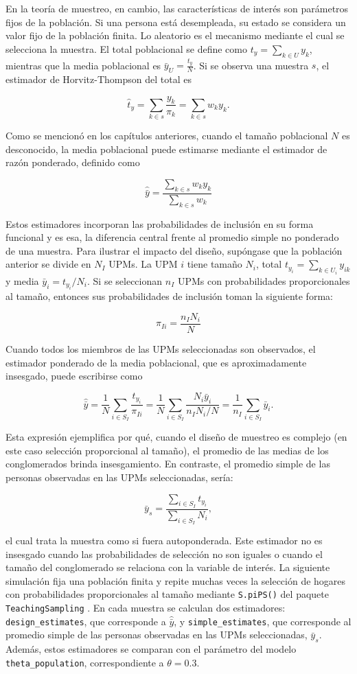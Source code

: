 \documentclass[
  spanish,
  12pt,
]{book}
\begin{document}
En la teoría de muestreo, en cambio, las características de interés son parámetros fijos de la población. Si una persona está desempleada, su estado se considera un valor fijo de la población finita. Lo aleatorio es el mecanismo mediante el cual se selecciona la muestra. El total poblacional se define como \(t_y = \sum_{k \in U} y_k\), mientras que la media poblacional es \(\bar{y}_U = \frac{t_y}{N}\). Si se observa una muestra \(s\), el estimador de Horvitz-Thompson del total es

\[
\hat{t}_{y} = \sum_{k \in s}\frac{y_k}{\pi_k}
= \sum_{k \in s}w_k y_k.
\]

Como se mencionó en los capítulos anteriores, cuando el tamaño poblacional \(N\) es desconocido, la media poblacional puede estimarse mediante el estimador de razón ponderado, definido como

\[
\hat{\bar{y}} =
\frac{\sum_{k \in s}w_k y_k}
{\sum_{k \in s}w_k}
\]

Estos estimadores incorporan las probabilidades de inclusión en su forma funcional y es esa, la diferencia central frente al promedio simple no ponderado de una muestra. Para ilustrar el impacto del diseño, supóngase que la población anterior se divide en \(N_I\) UPMs. La UPM \(i\) tiene tamaño \(N_i\), total \(t_{y_i}=\sum_{k \in U_i}y_{ik}\) y media \(\bar{y}_i=t_{y_i}/N_i\). Si se seleccionan \(n_I\) UPMs con probabilidades proporcionales al tamaño, entonces sus probabilidades de inclusión toman la siguiente forma:

\[
\pi_{Ii} = \frac{n_I N_i}{N}
\]

Cuando todos los miembros de las UPMs seleccionadas son observados, el estimador ponderado de la media poblacional, que es aproximadamente insesgado, puede escribirse como

\[
\hat{\bar{y}}
= \frac{1}{N}\sum_{i \in S_I}\frac{t_{y_i}}{\pi_{Ii}}
= \frac{1}{N}\sum_{i \in S_I}\frac{N_i\bar{y}_i}{n_I N_i/N}
= \frac{1}{n_I}\sum_{i \in S_I}\bar{y}_i.
\]

Esta expresión ejemplifica por qué, cuando el diseño de muestreo es complejo (en este caso selección proporcional al tamaño), el promedio de las medias de los conglomerados brinda insesgamiento. En contraste, el promedio simple de las personas observadas en las UPMs seleccionadas, sería:

\[
\bar{y}_s =
\frac{\sum_{i \in S_I}t_{y_i}}
     {\sum_{i \in S_I}N_i},
\]

el cual trata la muestra como si fuera autoponderada. Este estimador no es insesgado cuando las probabilidades de selección no son iguales o cuando el tamaño del conglomerado se relaciona con la variable de interés. La siguiente simulación fija una población finita y repite muchas veces la selección de hogares con probabilidades proporcionales al tamaño mediante \texttt{S.piPS()} del paquete \texttt{TeachingSampling} \citep{GutierrezT2020}. En cada muestra se calculan dos estimadores: \texttt{design\_estimates}, que corresponde a \(\hat{\bar{y}}\), y \texttt{simple\_estimates}, que corresponde al promedio simple de las personas observadas en las UPMs seleccionadas, \(\bar{y}_s\). Además, estos estimadores se comparan con el parámetro del modelo \texttt{theta\_population}, correspondiente a \(\theta = 0.3\).
\end{document}
